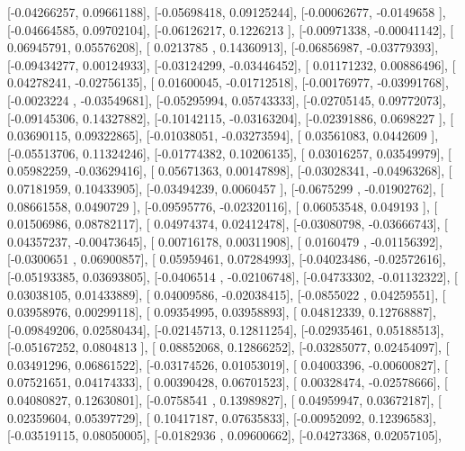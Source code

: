 \documentclass{article}
\begin{document}
       [-0.04266257,  0.09661188],
       [-0.05698418,  0.09125244],
       [-0.00062677, -0.0149658 ],
       [-0.04664585,  0.09702104],
       [-0.06126217,  0.1226213 ],
       [-0.00971338, -0.00041142],
       [ 0.06945791,  0.05576208],
       [ 0.0213785 ,  0.14360913],
       [-0.06856987, -0.03779393],
       [-0.09434277,  0.00124933],
       [-0.03124299, -0.03446452],
       [ 0.01171232,  0.00886496],
       [ 0.04278241, -0.02756135],
       [ 0.01600045, -0.01712518],
       [-0.00176977, -0.03991768],
       [-0.0023224 , -0.03549681],
       [-0.05295994,  0.05743333],
       [-0.02705145,  0.09772073],
       [-0.09145306,  0.14327882],
       [-0.10142115, -0.03163204],
       [-0.02391886,  0.0698227 ],
       [ 0.03690115,  0.09322865],
       [-0.01038051, -0.03273594],
       [ 0.03561083,  0.0442609 ],
       [-0.05513706,  0.11324246],
       [-0.01774382,  0.10206135],
       [ 0.03016257,  0.03549979],
       [ 0.05982259, -0.03629416],
       [ 0.05671363,  0.00147898],
       [-0.03028341, -0.04963268],
       [ 0.07181959,  0.10433905],
       [-0.03494239,  0.0060457 ],
       [-0.0675299 , -0.01902762],
       [ 0.08661558,  0.0490729 ],
       [-0.09595776, -0.02320116],
       [ 0.06053548,  0.049193  ],
       [ 0.01506986,  0.08782117],
       [ 0.04974374,  0.02412478],
       [-0.03080798, -0.03666743],
       [ 0.04357237, -0.00473645],
       [ 0.00716178,  0.00311908],
       [ 0.0160479 , -0.01156392],
       [-0.0300651 ,  0.06900857],
       [ 0.05959461,  0.07284993],
       [-0.04023486, -0.02572616],
       [-0.05193385,  0.03693805],
       [-0.0406514 , -0.02106748],
       [-0.04733302, -0.01132322],
       [ 0.03038105,  0.01433889],
       [ 0.04009586, -0.02038415],
       [-0.0855022 ,  0.04259551],
       [ 0.03958976,  0.00299118],
       [ 0.09354995,  0.03958893],
       [ 0.04812339,  0.12768887],
       [-0.09849206,  0.02580434],
       [-0.02145713,  0.12811254],
       [-0.02935461,  0.05188513],
       [-0.05167252,  0.0804813 ],
       [ 0.08852068,  0.12866252],
       [-0.03285077,  0.02454097],
       [ 0.03491296,  0.06861522],
       [-0.03174526,  0.01053019],
       [ 0.04003396, -0.00600827],
       [ 0.07521651,  0.04174333],
       [ 0.00390428,  0.06701523],
       [ 0.00328474, -0.02578666],
       [ 0.04080827,  0.12630801],
       [-0.0758541 ,  0.13989827],
       [ 0.04959947,  0.03672187],
       [ 0.02359604,  0.05397729],
       [ 0.10417187,  0.07635833],
       [-0.00952092,  0.12396583],
       [-0.03519115,  0.08050005],
       [-0.0182936 ,  0.09600662],
       [-0.04273368,  0.02057105],
\end{document}
